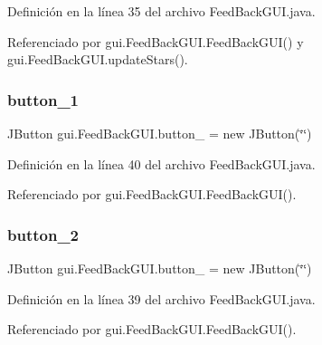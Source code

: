 Definición en la línea 35 del archivo Feed\+Back\+G\+U\+I.\+java.



Referenciado por gui.\+Feed\+Back\+G\+U\+I.\+Feed\+Back\+G\+U\+I() y gui.\+Feed\+Back\+G\+U\+I.\+update\+Stars().

\mbox{\label{classgui_1_1_feed_back_g_u_i_a4eff111b91a4af9d69b07d239f8c4175}} 
\subsubsection{\texorpdfstring{button\_1}{button\_1}}
{\footnotesize\ttfamily J\+Button gui.\+Feed\+Back\+G\+U\+I.\+button\+\_ = new J\+Button(\char`\"{}\char`\"{})\hspace{0.3cm}{\ttfamily [private]}}



Definición en la línea 40 del archivo Feed\+Back\+G\+U\+I.\+java.



Referenciado por gui.\+Feed\+Back\+G\+U\+I.\+Feed\+Back\+G\+U\+I().

\mbox{\label{classgui_1_1_feed_back_g_u_i_aea4392764854bea3595a730551c76e82}} 
\subsubsection{\texorpdfstring{button\_2}{button\_2}}
{\footnotesize\ttfamily J\+Button gui.\+Feed\+Back\+G\+U\+I.\+button\+\_ = new J\+Button(\char`\"{}\char`\"{})\hspace{0.3cm}{\ttfamily [private]}}



Definición en la línea 39 del archivo Feed\+Back\+G\+U\+I.\+java.



Referenciado por gui.\+Feed\+Back\+G\+U\+I.\+Feed\+Back\+G\+U\+I().

\mbox{\label{classgui_1_1_feed_back_g_u_i_aecc5a4dbfd0b1914634b7560af5b665e}} 
